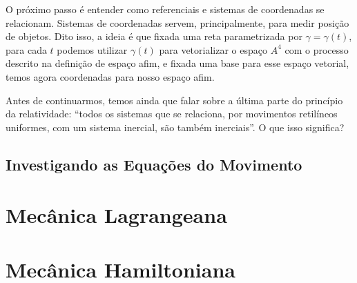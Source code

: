 \documentclass[a4paper,12pt]{book}
\begin{document}
O próximo passo é entender como referenciais e sistemas de coordenadas se relacionam. Sistemas de coordenadas servem, principalmente, para medir posição de objetos. Dito isso, a ideia é que fixada uma reta parametrizada por $\gamma = \gamma(t)$, para cada $t$ podemos utilizar 
$\gamma(t)$ para vetorializar o espaço $A^4$ com o processo descrito na definição de espaço afim, e fixada uma base para esse espaço vetorial, temos agora coordenadas para nosso espaço afim.

Antes de continuarmos, temos ainda que falar sobre a última parte do princípio da relatividade: ``todos os sistemas que se relaciona, por movimentos retilíneos uniformes, com um sistema inercial, são também inerciais''. O que isso significa?

\chapter{Investigando as Equações do Movimento}

\part{Mecânica Lagrangeana}
\part{Mecânica Hamiltoniana}

\nocite{*}
\clearpage
\thispagestyle{empty}
\end{document}
